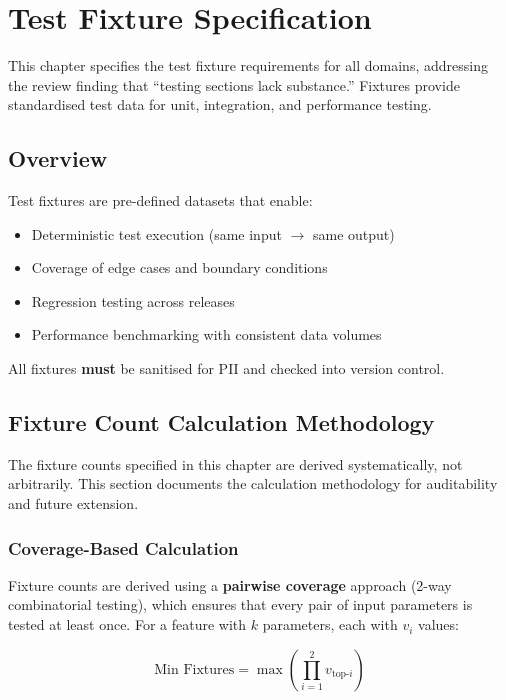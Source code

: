 \chapter{Test Fixture Specification}\label{ch:test-fixtures}\label{sim:ch:test-fixtures}

This chapter specifies the test fixture requirements for all domains, addressing
the review finding that ``testing sections lack substance.'' Fixtures provide
standardised test data for unit, integration, and performance testing.

\section{Overview}

Test fixtures are pre-defined datasets that enable:
\begin{itemize}
  \item Deterministic test execution (same input $\rightarrow$ same output)
  \item Coverage of edge cases and boundary conditions
  \item Regression testing across releases
  \item Performance benchmarking with consistent data volumes
\end{itemize}

All fixtures \textbf{must} be sanitised for PII and checked into version control.

\section{Fixture Count Calculation Methodology}
\label{sec:fixture-count-methodology}

The fixture counts specified in this chapter are derived systematically, not
arbitrarily. This section documents the calculation methodology for auditability
and future extension.

\subsection{Coverage-Based Calculation}

Fixture counts are derived using a \textbf{pairwise coverage} approach (2-way
combinatorial testing), which ensures that every pair of input parameters is
tested at least once. For a feature with $k$ parameters, each with $v_i$ values:

\[
\text{Min Fixtures} = \max\left(\prod_{i=1}^{2} v_{\text{top-}i}\right)
\]

